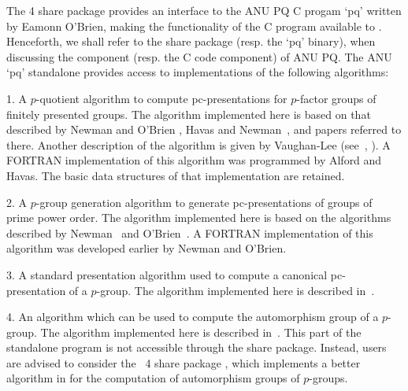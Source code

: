 

The {\GAP} 4 share package {\ANUPQ} provides an interface to the ANU PQ C
progam `pq' written by Eamonn O'Brien, making the functionality of the  C
program available to {\GAP}. Henceforth, we shall refer to  the  {\ANUPQ}
share package  (resp.  the  `pq'  binary),  when  discussing  the  {\GAP}
component (resp. the C code component) of ANU PQ. The ANU `pq' standalone
provides access to implementations of the following algorithms:

\beginlist

\item{1.}
A $p$-quotient  algorithm  to  compute  pc-presentations  for  $p$-factor
groups of finitely presented groups. The algorithm  implemented  here  is
based on that described by Newman  and  O'Brien  \cite{NO96},  Havas  and
Newman~\cite{HN80}, and papers referred to there. Another description  of
the algorithm is given by Vaughan-Lee (see~\cite{Vau90a}, \cite{Vau90b}).
A FORTRAN implementation of this algorithm was programmed by  Alford  and
Havas. The basic data structures of that implementation are retained.

\item{2.} 
A $p$-group generation algorithm to generate pc-presentations  of  groups
of prime power order. The algorithm implemented  here  is  based  on  the
algorithms described by Newman~\cite{New77} and  O'Brien~\cite{OBr90}.  A
FORTRAN implementation of this algorithm was developed earlier by  Newman
and O'Brien.

\item{3.}
A  standard  presentation  algorithm  used   to   compute   a   canonical
pc-presentation  of  a  $p$-group.  The  algorithm  implemented  here  is
described in~\cite{OBr94}.

\item{4.} 
An algorithm which can be used to compute the  automorphism  group  of  a
$p$-group. The algorithm implemented here is  described  in~\cite{OBr94}.
This part of  the  standalone  program  is  not  accessible  through  the
{\ANUPQ} share package.  Instead,  users  are  advised  to  consider  the
{\GAP}~4 share package {\AutPGrp}, which implements a better algorithm in
{\GAP} for the computation of automorphism groups of $p$-groups.

